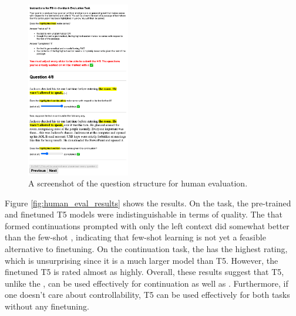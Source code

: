 \begin{figure}[tbp]
    \centering
    \includegraphics[width=0.4\textwidth, frame]{figures/amt_screenshot.png}
    \caption{A screenshot of the question structure for human evaluation.}
    \label{fig:amturk_ui}
\end{figure}

Figure \ref{fig:human_eval_results} shows the results.
On the \FitB{} task, the pre-trained and finetuned T5 models were indistinguishable in terms of quality.
The \LLM{} that formed continuations prompted with only the left context did somewhat better than the few-shot \LLM{}, indicating that few-shot learning is not yet a feasible alternative to finetuning.
On the continuation task, the \LLM{} has the highest rating, which is unsurprising since it is a much larger model than T5.
However, the finetuned T5 is rated almost as highly.
Overall, these results suggest that T5, unlike the \LLM{}, can be used effectively for continuation as well as \FitB.
Furthermore, if one doesn't care about controllability, T5 can be used effectively for both tasks without any finetuning.

